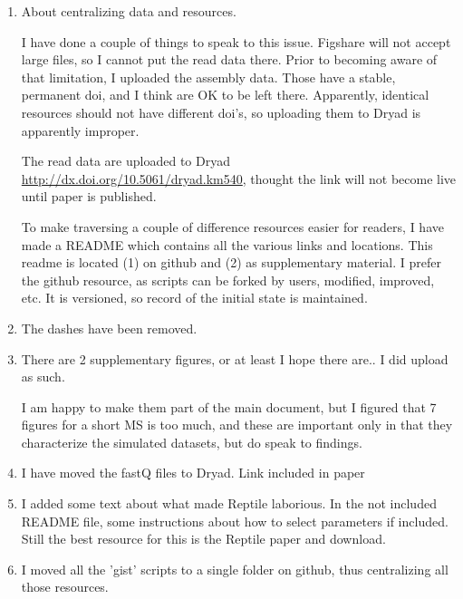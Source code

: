 \documentclass[11pt]{article}
\begin{document}
\begin{enumerate}

\item About centralizing data and resources.

\begin{addmargin}[2em]{2em}
I have done a couple of things to speak to this issue. Figshare will not accept large files, so I cannot put the read data there. Prior to becoming aware of that limitation, I uploaded the assembly data. Those have a stable, permanent doi, and I think are OK to be left there. Apparently, identical resources should not have different doi's, so uploading them to Dryad is apparently improper. 

\noindent
The read data are uploaded to Dryad \url{http://dx.doi.org/10.5061/dryad.km540}, thought the link will not become live until paper is published.

\noindent
To make traversing a couple of difference resources easier for readers, I have made a README which contains all the various links and locations.  This readme is located (1) on github and (2) as supplementary material. I prefer the github resource, as scripts can be forked by users, modified, improved, etc. It is versioned, so record of the initial state is maintained.



\end{addmargin}



\item The dashes have been removed. 

\item There are 2 supplementary figures, or at least I hope there are.. I did upload as such. 

\begin{addmargin}[2em]{2em}
I am happy to make them part of the main document, but I figured that 7 figures for a short MS is too much, and these are important only in that they characterize the simulated datasets, but do speak to findings.
\end{addmargin}

\item I have moved the fastQ files to Dryad. Link included in paper

\item I added some text about what made Reptile laborious. In the not included README file, some instructions about how to select parameters if included. Still the best resource for this is the Reptile paper and download.

\item I moved all the 'gist' scripts to a single folder on github, thus centralizing all those resources. 

\end{enumerate}
\end{document}
